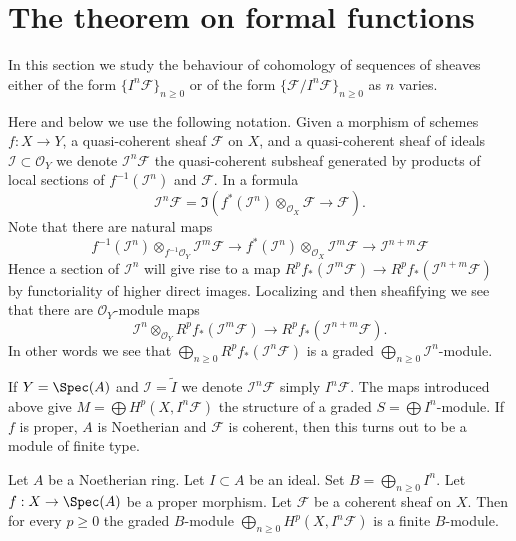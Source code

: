 \section{The theorem on formal functions}
\label{section-theorem-formal-functions}

\noindent
In this section we study the behaviour of cohomology of
sequences of sheaves either of the form $\{I^n\mathcal{F}\}_{n \geq 0}$
or of the form $\{\mathcal{F}/I^n\mathcal{F}\}_{n \geq 0}$ as
$n$ varies.

\medskip\noindent
Here and below we use the following notation.
Given a morphism of schemes $f : X \to Y$, a quasi-coherent sheaf
$\mathcal{F}$ on $X$, and a quasi-coherent sheaf of ideals
$\mathcal{I} \subset \mathcal{O}_Y$ we denote
$\mathcal{I}^n\mathcal{F}$ the quasi-coherent subsheaf generated
by products of local sections of $f^{-1}(\mathcal{I}^n)$ and
$\mathcal{F}$. In a formula
$$
\mathcal{I}^n\mathcal{F}
=
\Im\left(
f^*(\mathcal{I}^n) \otimes_{\mathcal{O}_X} \mathcal{F}
\longrightarrow
\mathcal{F}
\right).
$$
Note that there are natural maps
$$
f^{-1}(\mathcal{I}^n) \otimes_{f^{-1}\mathcal{O}_Y} \mathcal{I}^m\mathcal{F}
\longrightarrow
f^*(\mathcal{I}^n) \otimes_{\mathcal{O}_X} \mathcal{I}^m\mathcal{F}
\longrightarrow
\mathcal{I}^{n + m}\mathcal{F}
$$
Hence a section of $\mathcal{I}^n$ will give rise to a
map $R^pf_*(\mathcal{I}^m\mathcal{F}) \to
R^pf_*(\mathcal{I}^{n + m}\mathcal{F})$ by functoriality
of higher direct images. Localizing and then sheafifying we
see that there are $\mathcal{O}_Y$-module maps
$$
\mathcal{I}^n \otimes_{\mathcal{O}_Y} R^pf_*(\mathcal{I}^m\mathcal{F})
\longrightarrow
R^pf_*(\mathcal{I}^{n + m}\mathcal{F}).
$$
In other words we see that
$\bigoplus_{n \geq 0} R^pf_*(\mathcal{I}^n\mathcal{F})$
is a graded $\bigoplus_{n \geq 0} \mathcal{I}^n$-module.

\medskip\noindent
If $Y = \Spec(A)$ and $\mathcal{I} = \widetilde{I}$ we denote
$\mathcal{I}^n\mathcal{F}$ simply $I^n\mathcal{F}$. The maps
introduced above give $M = \bigoplus H^p(X, I^n\mathcal{F})$ the
structure of a graded $S = \bigoplus I^n$-module. If $f$ is proper,
$A$ is Noetherian and $\mathcal{F}$ is coherent, then this turns out
to be a module of finite type.

\begin{lemma}
\label{lemma-cohomology-powers-ideal-times-F}
Let $A$ be a Noetherian ring.
Let $I \subset A$ be an ideal.
Set $B = \bigoplus_{n \geq 0} I^n$.
Let $f : X \to \Spec(A)$ be a proper morphism.
Let $\mathcal{F}$ be a coherent sheaf on $X$.
Then for every $p \geq 0$ the graded $B$-module
$\bigoplus_{n \geq 0} H^p(X, I^n\mathcal{F})$ is
a finite $B$-module.
\end{lemma}

